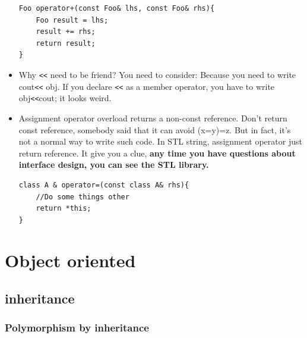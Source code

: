 \documentclass[a4paper,11pt,twoside]{book}
\begin{document}
\begin{itemize}
\begin{lstlisting}[numbers=none]
Foo operator+(const Foo& lhs, const Foo& rhs){
	Foo result = lhs;
	result += rhs;
	return result;
}
\end{lstlisting}
	
	\item Why \verb=<<= need to be friend? You need to consider:  Because you need to write cout\verb=<<= obj. If you declare \verb=<<= as a member operator, you have to write obj\verb=<<=cout; it looks weird.
	
	\item Assignment operator overload returns a non-const reference. Don't return const reference, somebody said that it can avoid (x=y)=z. But in fact, it's not a normal way to write such code. In STL string, assignment operator just return reference. It give you a clue, \textbf{any time you have questions about interface design, you can see the STL library.}
\begin{lstlisting}[numbers=none]
class A & operator=(const class A& rhs){	
	//Do some things other
	return *this;
}
\end{lstlisting}
	
\end{itemize}


\section{Object oriented}

\subsection{inheritance}
\subsubsection{Polymorphism by inheritance}
\end{document}
